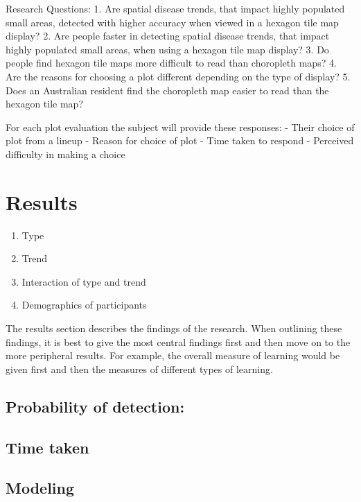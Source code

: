 \documentclass[conference,final,]{IEEEtran}
\providecommand{\tightlist}{%
  \setlength{\itemsep}{0pt}\setlength{\parskip}{0pt}}
\begin{document}
Research Questions: 1. Are spatial disease trends, that impact highly
populated small areas, detected with higher accuracy when viewed in a
hexagon tile map display? 2. Are people faster in detecting spatial
disease trends, that impact highly populated small areas, when using a
hexagon tile map display? 3. Do people find hexagon tile maps more
difficult to read than choropleth maps? 4. Are the reasons for choosing
a plot different depending on the type of display? 5. Does an Australian
resident find the choropleth map easier to read than the hexagon tile
map?

For each plot evaluation the subject will provide these responses: -
Their choice of plot from a lineup - Reason for choice of plot - Time
taken to respond - Perceived difficulty in making a choice

\hypertarget{results}{%
\section{Results}\label{results}}

\begin{enumerate}
\def\labelenumi{\arabic{enumi}.}
\tightlist
\item
  Type\\
\item
  Trend
\item
  Interaction of type and trend
\item
  Demographics of participants
\end{enumerate}

The results section describes the findings of the research. When
outlining these findings, it is best to give the most central findings
first and then move on to the more peripheral results. For example, the
overall measure of learning would be given first and then the measures
of different types of learning.

\hypertarget{probability-of-detection}{%
\subsection{Probability of detection:}\label{probability-of-detection}}

\hypertarget{time-taken}{%
\subsection{Time taken}\label{time-taken}}

\hypertarget{modeling}{%
\subsection{Modeling}\label{modeling}}
\end{document}

